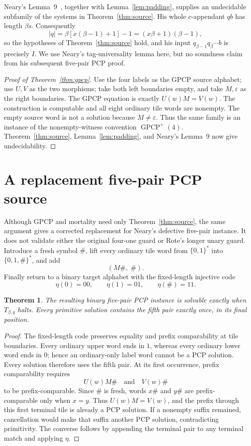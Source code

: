 \documentclass[11pt]{article}
\newtheorem{theorem}{Theorem}[section]
\newcommand{\eps}{\varepsilon}
\begin{document}
Neary's Lemma~9~\cite{Neary15}, together with Lemma~\ref{lem:padding}, supplies an
undecidable subfamily of the systems in Theorem~\ref{thm:source}.  His whole $c$-appendant
$qb$ has length $\beta s$.  Consequently
\[
  |q|=\beta[x(\beta-1)+1]-1=(x\beta+1)(\beta-1),
\]
so the hypotheses of Theorem~\ref{thm:source} hold, and his input
$q_{\beta-1}q_\beta\cdots b$ is precisely $I$.  We use Neary's tag-universality lemma here,
but no soundness claim from his subsequent five-pair PCP proof.

\begin{proof}[Proof of Theorem~\ref{thm:gpcp}]
Use the four labels as the GPCP source alphabet; use $U,V$ as the two morphisms; take both
left boundaries empty, and take $M,\eps$ as the right boundaries.  The GPCP equation is
exactly $U(w)M=V(w)$.  The construction is computable and all eight ordinary tile words
are nonempty.  The empty source word is not a solution because $M\ne\eps$.
Thus the same family is an instance of the nonempty-witness convention
$\operatorname{GPCP}^{+}(4)$.  Theorem~\ref{thm:source}, Lemma~\ref{lem:padding}, and
Neary's Lemma~9 now give undecidability.
\end{proof}

\section{A replacement five-pair PCP source}\label{sec:marker}

Although GPCP and mortality need only Theorem~\ref{thm:source}, the same argument gives a
corrected replacement for Neary's defective five-pair instance.  It does not validate either
the original four-one guard or Rote's longer unary guard.  Introduce a fresh symbol $\#$,
lift every ordinary tile word from $\{0,1\}^*$ into $\{0,1,\#\}^*$, and add
\[
  (M\#,\;\#).
\]
Finally return to a binary target alphabet with the fixed-length injective code
\[
  \eta(0)=00,\qquad \eta(1)=01,\qquad \eta(\#)=11.
\]

\begin{theorem}\label{thm:five-pcp}
The resulting binary five-pair PCP instance is solvable exactly when $T_{\beta,q}$ halts.
Every primitive solution contains the fifth pair exactly once, in its final position.
\end{theorem}

\begin{proof}
The fixed-length code preserves equality and prefix comparability at tile boundaries.
Every ordinary upper word ends in $1$, whereas every ordinary lower word ends in $0$;
hence an ordinary-only label word cannot be a PCP solution.  Every solution therefore uses
the fifth pair.  At its first occurrence, prefix comparability requires
\[
  U(w)M\#\quad\text{and}\quad V(w)\#
\]
to be prefix-comparable.  Since $\#$ is fresh, words $x\#$ and $y\#$ are prefix-comparable
only when $x=y$.  Thus $U(w)M=V(w)$, and the prefix through this first terminal tile is
already a PCP solution.  If a nonempty suffix remained, cancellation would make that suffix
another PCP solution, contradicting primitivity.  The converse follows by appending the
terminal pair to any terminal match and applying $\eta$.
\end{proof}
\end{document}
